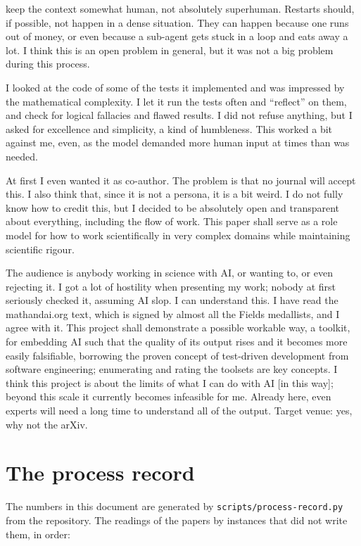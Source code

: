 \documentclass[11pt,a4paper]{article}
\newcommand{\file}[1]{\texttt{#1}}
\begin{document}
\begin{description}[leftmargin=1.2em,itemsep=4pt,font=\normalfont\itshape]
keep the context somewhat human, not absolutely superhuman. Restarts should, if possible, not happen in a dense
situation. They can happen because one runs out of money, or even because a sub-agent gets stuck in a loop and eats
away a lot. I think this is an open problem in general, but it was not a big problem during this process.
\item[Q10, own verification.] I looked at the code of some of the tests it implemented and was impressed by the
mathematical complexity. I let it run the tests often and ``reflect'' on them, and check for logical fallacies and
flawed results. I did not refuse anything, but I asked for excellence and simplicity, a kind of humbleness. This
worked a bit against me, even, as the model demanded more human input at times than was needed.
\item[Q11, authorship.] At first I even wanted it as co-author. The problem is that no journal will accept this. I
also think that, since it is not a persona, it is a bit weird. I do not fully know how to credit this, but I decided
to be absolutely open and transparent about everything, including the flow of work. This paper shall serve as a role
model for how to work scientifically in very complex domains while maintaining scientific rigour.
\item[Q12, this case study.] The audience is anybody working in science with AI, or wanting to, or even rejecting
it. I got a lot of hostility when presenting my work; nobody at first seriously checked it, assuming AI slop. I can
understand this. I have read the mathandai.org text, which is signed by almost all the Fields medallists, and I agree
with it. This project shall demonstrate a possible workable way, a toolkit, for embedding AI such that the quality of
its output rises and it becomes more easily falsifiable, borrowing the proven concept of test-driven development from
software engineering; enumerating and rating the toolsets are key concepts. I think this project is about the limits
of what I can do with AI [in this way]; beyond this scale it currently becomes infeasible for me. Already here, even
experts will need a long time to understand all of the output. Target venue: yes, why not the arXiv.
\end{description}

\section{The process record}\label{app:record}
The numbers in this document are generated by \file{scripts/process-record.py} from the repository. The readings
of the papers by instances that did not write them, in order:
\end{document}
